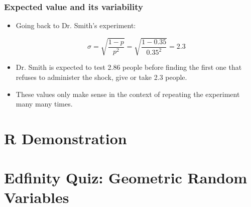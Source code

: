 \documentclass[slidestop,compress,mathserif]{beamer}
\begin{document}
\begin{frame}
\frametitle{Expected value and its variability}


\pause

\begin{itemize}

\item Going back to Dr. Smith's experiment:

\[ \sigma = \sqrt{\frac{1-p}{p^2}} = \sqrt{\frac{1-0.35}{0.35^2}} = 2.3 \]

\pause

\item Dr. Smith is expected to test 2.86 people before finding the first one that refuses to administer the shock, give or take 2.3 people.

\pause

\item These values only make sense in the context of repeating the experiment many many times.

\end{itemize}

\end{frame}


\section{R Demonstration}


\section{Edfinity Quiz: Geometric Random Variables}

\end{document}
